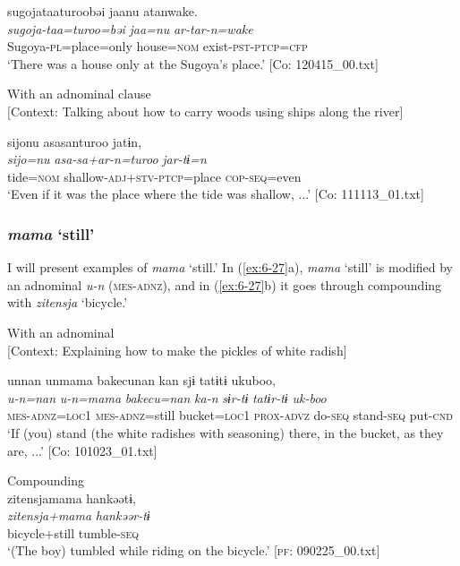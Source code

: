 {\TM}
\glll sugojataaturoobəi  jaanu  atanwake.\\
      \textit{sugoja-taa=turoo=bəi}  \textit{jaa=nu}  \textit{ar-tar-n=wake}\\
      Sugoya-\textsc{pl}=place=only  house=\textsc{nom}  exist-\textsc{pst}-\textsc{ptcp}=\textsc{cfp}\\
\glt ‘There was a house only at the Sugoya’s place.’ [Co: 120415\_00.txt]

\ex With an adnominal clause\\{}
[Context: Talking about how to carry woods using ships along the river]

{\TM}
\glll {\textbar}sijo{\textbar}nu  asasanturoo  jatɨn,\\
      \textit{sijo=nu}  \textit{asa-sa+ar-n=turoo}  \textit{jar-tɨ=n}\\
      tide=\textsc{nom}  shallow-\textsc{adj}+\textsc{stv}-\textsc{ptcp}=place  \textsc{cop}-\textsc{seq}=even\\
\glt ‘Even if it was the place where the tide was shallow, ...’ [Co: 111113\_01.txt]
\z
\z

\subsubsection{ \textit{mama} ‘still’}

I will present examples of \textit{mama} ‘still.’ In (\ref{ex:6-27}a), \textit{mama} ‘still’ is modified by an adnominal \textit{u-n} (\textsc{mes}-\textsc{adnz}), and in (\ref{ex:6-27}b) it goes through compounding with \textit{zitensja} ‘bicycle.’

\ea\label{ex:6-27}
\ea With an adnominal\\{}
[Context: Explaining how to make the pickles of white radish]

{\TM}
\glll unnan  unmama  {\textbar}bakecu{\textbar}nan  kan    sjɨ  tatɨtɨ  ukuboo,\\
      \textit{u-n=nan}  \textit{u-n=mama}  \textit{bakecu=nan}  \textit{ka-n}   \textit{sɨr-tɨ}  \textit{tatɨr-tɨ}  \textit{uk-boo}\\
      \textsc{mes}-\textsc{adnz}=\textsc{loc1}  \textsc{mes}-\textsc{adnz}=still  bucket=\textsc{loc1}  \textsc{prox}-\textsc{advz}  do-\textsc{seq}  stand-\textsc{seq}  put-\textsc{cnd}\\
\glt ‘If (you) stand (the white radishes with seasoning) there, in the bucket, as they are, ...’ [Co: 101023\_01.txt]

\ex Compounding\\
{\TM}
\glll  {\textbar}zitensja{\textbar}mama  hankəətɨ,\\
\textit{zitensja+mama}  \textit{hankəər-tɨ}\\
bicycle+still  tumble-\textsc{seq}\\
\glt ‘(The boy) tumbled while riding on the bicycle.’ [\textsc{pf}: 090225\_00.txt]
\z
\z

